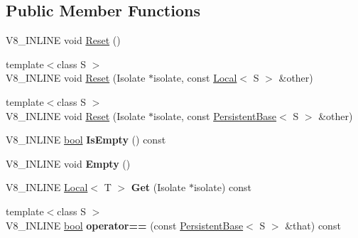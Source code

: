 \subsection*{Public Member Functions}
\begin{DoxyCompactItemize}
\item 
V8\+\_\+\+I\+N\+L\+I\+NE void \mbox{\hyperlink{classv8_1_1PersistentBase_a174bb1e45b18fd4eeaee033622825bb8}{Reset}} ()
\item 
{\footnotesize template$<$class S $>$ }\\V8\+\_\+\+I\+N\+L\+I\+NE void \mbox{\hyperlink{classv8_1_1PersistentBase_a11164f0dfc9a16d79809236e7a9670aa}{Reset}} (Isolate $\ast$isolate, const \mbox{\hyperlink{classv8_1_1Local}{Local}}$<$ S $>$ \&other)
\item 
{\footnotesize template$<$class S $>$ }\\V8\+\_\+\+I\+N\+L\+I\+NE void \mbox{\hyperlink{classv8_1_1PersistentBase_af6b8f929b0cbaa83341df48ca3b03ef5}{Reset}} (Isolate $\ast$isolate, const \mbox{\hyperlink{classv8_1_1PersistentBase}{Persistent\+Base}}$<$ S $>$ \&other)
\item 
\mbox{\label{classv8_1_1PersistentBase_aa4d270d1946260813a4fba08121fdbd1}} 
V8\+\_\+\+I\+N\+L\+I\+NE \mbox{\hyperlink{classbool}{bool}} {\bfseries Is\+Empty} () const
\item 
\mbox{\label{classv8_1_1PersistentBase_abb8a06471ea86de1731a3c94a879b00e}} 
V8\+\_\+\+I\+N\+L\+I\+NE void {\bfseries Empty} ()
\item 
\mbox{\label{classv8_1_1PersistentBase_ae943e4070eb5d18493575b37a0cfb6f8}} 
V8\+\_\+\+I\+N\+L\+I\+NE \mbox{\hyperlink{classv8_1_1Local}{Local}}$<$ T $>$ {\bfseries Get} (Isolate $\ast$isolate) const
\item 
\mbox{\label{classv8_1_1PersistentBase_a2a267a582638e2acc864f672b25e4b9c}} 
{\footnotesize template$<$class S $>$ }\\V8\+\_\+\+I\+N\+L\+I\+NE \mbox{\hyperlink{classbool}{bool}} {\bfseries operator==} (const \mbox{\hyperlink{classv8_1_1PersistentBase}{Persistent\+Base}}$<$ S $>$ \&that) const
\item 
\mbox{\label{classv8_1_1PersistentBase_a4a2ec8bcbe0fe95cac2e3c17b800557e}} 

\end{DoxyCompactItemize}
